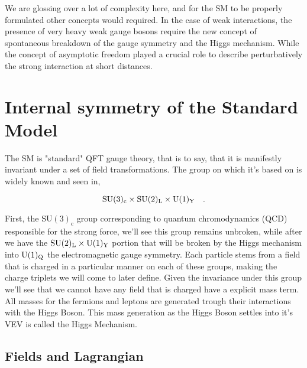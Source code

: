 We are glossing over a lot of complexity here, and for the SM to be properly formulated other concepts would required. In the case of weak interactions, the presence of very heavy weak gauge bosons require the new concept of spontaneous breakdown of the gauge symmetry and the Higgs mechanism. While 
%
the concept of asymptotic freedom played a crucial role to describe perturbatively the strong interaction at short distances.  
% 

\section{Internal symmetry of the Standard Model}

The SM is "standard" QFT gauge theory, that is to say, that it is manifestly invariant under a set of field transformations. The group on which it's based on is widely known and seen in, 

\begin{equation}
\mathrm{SU}(3)_{\mathrm{c}} \times \mathrm{SU}(2)_{\mathrm{L}} \times \mathrm{U}(1)_{\mathrm{Y}} \quad  .
\label{eq:SM Group}
\end{equation} 

First, the $\mathrm{SU}(3)_{\mathrm{c}}$ group corresponding to quantum chromodynamics (QCD) responsible for the strong force,  we'll see this group remains unbroken, while after we have the $\mathrm{SU}(2)_{\mathrm{L}} \times \mathrm{U}(1)_{\mathrm{Y}}$ portion that will be broken by the Higgs mechanism into $\mathrm{U}(1)_{\mathrm{Q}}$ the electromagnetic gauge symmetry. Each particle stems from a field that is charged in a particular manner on each of these groups, making the charge triplets we will come to later define. Given the invariance under this group we'll see that we cannot have any field that is charged have a explicit mass term. { \color{gray} All masses for the fermions and leptons are generated trough their interactions with the Higgs Boson. This mass generation as the Higgs Boson settles into it's VEV is called the Higgs Mechanism. } 

\subsection{Fields and Lagrangian}

